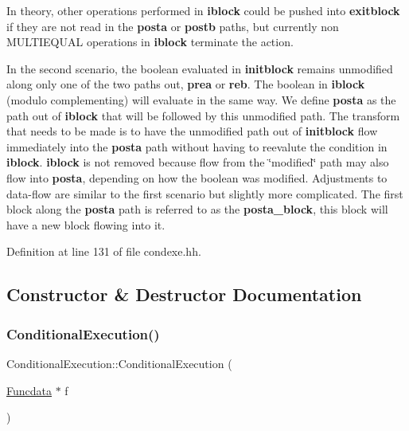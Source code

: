 In theory, other operations performed in {\bfseries{iblock}} could be pushed into {\bfseries{exitblock}} if they are not read in the {\bfseries{posta}} or {\bfseries{postb}} paths, but currently non M\+U\+L\+T\+I\+E\+Q\+U\+AL operations in {\bfseries{iblock}} terminate the action.

In the second scenario, the boolean evaluated in {\bfseries{initblock}} remains unmodified along only one of the two paths out, {\bfseries{prea}} or {\bfseries{reb}}. The boolean in {\bfseries{iblock}} (modulo complementing) will evaluate in the same way. We define {\bfseries{posta}} as the path out of {\bfseries{iblock}} that will be followed by this unmodified path. The transform that needs to be made is to have the unmodified path out of {\bfseries{initblock}} flow immediately into the {\bfseries{posta}} path without having to reevalute the condition in {\bfseries{iblock}}. {\bfseries{iblock}} is not removed because flow from the \char`\"{}modified\char`\"{} path may also flow into {\bfseries{posta}}, depending on how the boolean was modified. Adjustments to data-\/flow are similar to the first scenario but slightly more complicated. The first block along the {\bfseries{posta}} path is referred to as the {\bfseries{posta\+\_\+block}}, this block will have a new block flowing into it. 

Definition at line 131 of file condexe.\+hh.



\subsection{Constructor \& Destructor Documentation}
\mbox{\label{class_conditional_execution_a8070a0147522c29ebcce9ff781a53575}} 
\subsubsection{\texorpdfstring{ConditionalExecution()}{ConditionalExecution()}}
{\footnotesize\ttfamily Conditional\+Execution\+::\+Conditional\+Execution (\begin{DoxyParamCaption}\item[{\mbox{\hyperlink{class_funcdata}{Funcdata}} $\ast$}]{f }\end{DoxyParamCaption})\hspace{0.3cm}{\ttfamily [inline]}}



